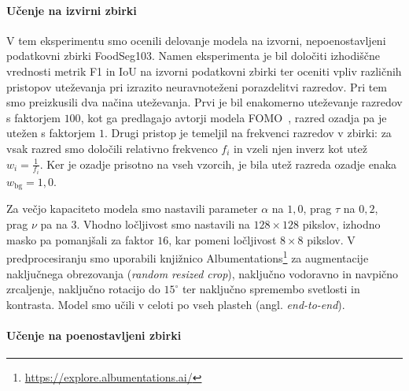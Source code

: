 \documentclass[a4paper,twoside,openright,12pt,slovene]{book}
\begin{document}
            \paragraph{Učenje na izvirni zbirki} \label{sct:eir-ucenje-na-izvirnem-datasetu}

            V tem eksperimentu smo ocenili delovanje modela na izvorni,
            nepoenostavljeni podatkovni zbirki FoodSeg103. Namen eksperimenta
            je bil določiti izhodiščne vrednosti metrik F1 in IoU na izvorni
            podatkovni zbirki ter oceniti vpliv različnih pristopov uteževanja
            pri izrazito neuravnoteženi porazdelitvi razredov. Pri tem
            smo preizkusili dva načina uteževanja. Prvi je bil enakomerno uteževanje
            razredov s faktorjem \(100\), kot ga predlagajo avtorji modela
            FOMO~\cite{src:fomodocs}, razred ozadja pa je utežen s faktorjem
            \(1\). Drugi pristop je temeljil na frekvenci razredov v zbirki: za
            vsak razred smo določili relativno frekvenco \(f_i\) in vzeli njen
            inverz kot utež \(w_i=\tfrac{1}{f_i}\).
            Ker je ozadje prisotno na vseh vzorcih, je bila utež razreda ozadje enaka
            \(w_{\mathrm{bg}}=1{,}0\).

            Za večjo kapaciteto modela smo nastavili parameter \(\alpha\) na
            \(1{,}0\), prag \(\tau\) na \(0{,}2\), prag \(\nu\) pa na
            \(3\). Vhodno ločljivost smo nastavili na \(128 \times 128\) pikslov,
            izhodno masko pa pomanjšali za faktor $16$, kar pomeni ločljivost
            \(8 \times 8\) pikslov. V predprocesiranju smo uporabili knjižnico
            Albumentations\footnote{\url{https://explore.albumentations.ai/}}
            za augmentacije naključnega obrezovanja (\emph{random resized
            crop}), naključno vodoravno in navpično zrcaljenje, naključno
            rotacijo do \(15^{\circ}\) ter naključno spremembo svetlosti in
            kontrasta. Model smo učili v celoti po vseh plasteh (angl.
            \emph{end-to-end}).

            \paragraph{Učenje na poenostavljeni zbirki}
\end{document}
